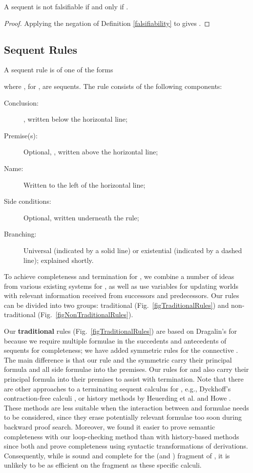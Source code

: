 \documentclass{llncs}
\numberwithin{equation}{section}
\begin{document}
\begin{lemma}\label{notFalsifiable}
A sequent  is not falsifiable if and only if .
\end{lemma}
\begin{proof}
Applying the negation of Definition \ref{falsifiability} to  gives .\end{proof}

\subsection{Sequent Rules}

\begin{definition}
A sequent rule is of one of the forms
	
where ,  for , are sequents. The rule consists of the following components:
	\begin{description}
		\item[Conclusion:] , written below the horizontal line;
		\item[Premise(s):] Optional, , written above the horizontal line;
		\item[Name:] Written to the left of the horizontal line;
		\item[Side conditions:] Optional, written underneath the rule;
		\item[Branching:] Universal (indicated by a solid line) or existential (indicated by a dashed line); explained shortly.							
	\end{description}
\end{definition}

To achieve completeness and termination for , we combine a number of ideas from various existing systems for , as well as use variables for updating worlds with relevant information received from successors and predecessors. Our rules can be divided into two groups: traditional (Fig.~\ref{figTraditionalRules}) and non-traditional (Fig.~\ref{figNonTraditionalRules}).

Our \textbf{traditional} rules (Fig.~\ref{figTraditionalRules}) are
based on Dragalin's  \cite{dragalin1988} for  because we
require multiple formulae in the succedents and antecedents of
sequents for completeness; we have added symmetric rules for the
 connective . The main difference
is that our  rule 
and the symmetric  
carry their principal formula and all side formulae into the premises.
Our rules for  and  also carry their principal formula
into their premises to assist with termination.  Note that there are
other approaches to a terminating sequent calculus for , e.g.,
Dyckhoff's contraction-free calculi \cite{dyckhoff1992}, or history
methods by Heuerding et al.  \cite{heuerding1998} and Howe
\cite{howe1998}. These methods are less suitable when the interaction
between  and  formulae needs to be considered, since
they erase potentially relevant formulae too soon during backward
proof search. Moreover, we found it easier to prove semantic
completeness with our loop-checking method than with history-based
methods since both \cite{heuerding1998} and \cite{howe1998} prove
completeness using syntactic transformations of derivations.
Consequently, while  is sound and complete for the 
(and ) fragment of , it is unlikely to be as
efficient on the fragment as these specific calculi.
\end{document}
